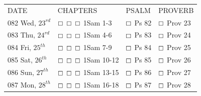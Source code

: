 \documentclass[11pt,landscape,twocolumn,letterpaper]{article}
\begin{document}
\begin{tabular}{p{0.8in}p{1.3in}p{1.2in}p{1.2in}}
DATE & CHAPTERS & PSALM & PROVERB \\
\tiny 082 \normalsize Wed, $23^{rd}$ & $\boxempty$ $\boxempty$ $\boxempty$ \hspace{.05in} \textcolor[rgb]{1.00,0.00,0.00}{1Sam 1-3} & $\boxempty$ \hspace{.05in} \textcolor[rgb]{0.00,1.00,0.00}{Ps 82} & $\boxempty$ \hspace{.05in} \textcolor[rgb]{0.00,0.00,1.00}{Prov 23}  \\

\tiny 083 \normalsize Thu, $24^{rd}$ & $\boxempty$ $\boxempty$ $\boxempty$ \hspace{.05in} \textcolor[rgb]{1.00,0.00,0.00}{1Sam 4-6} & $\boxempty$ \hspace{.05in} \textcolor[rgb]{0.00,1.00,0.00}{Ps 83} & $\boxempty$ \hspace{.05in} \textcolor[rgb]{0.00,0.00,1.00}{Prov 24}  \\

\tiny 084 \normalsize Fri, $25^{th}$ & $\boxempty$ $\boxempty$ $\boxempty$ \hspace{.05in} \textcolor[rgb]{1.00,0.00,0.00}{1Sam 7-9} & $\boxempty$ \hspace{.05in} \textcolor[rgb]{0.00,1.00,0.00}{Ps 84} & $\boxempty$ \hspace{.05in} \textcolor[rgb]{0.00,0.00,1.00}{Prov 25}  \\

\tiny 085 \normalsize Sat, $26^{th}$ &  $\boxempty$ $\boxempty$ $\boxempty$ \hspace{.05in} \textcolor[rgb]{1.00,0.00,0.00}{1Sam 10-12} &  $\boxempty$ \hspace{.05in} \textcolor[rgb]{0.00,1.00,0.00}{Ps 85} &  $\boxempty$ \hspace{.05in} \textcolor[rgb]{0.00,0.00,1.00}{Prov 26}  \\

\tiny 086 \normalsize Sun, $27^{th}$ &  $\boxempty$ $\boxempty$ $\boxempty$ \hspace{.05in} \textcolor[rgb]{1.00,0.00,0.00}{1Sam 13-15} &  $\boxempty$ \hspace{.05in} \textcolor[rgb]{0.00,1.00,0.00}{Ps 86} &  $\boxempty$ \hspace{.05in} \textcolor[rgb]{0.00,0.00,1.00}{Prov 27}  \\

\tiny 087 \normalsize Mon, $28^{th}$ &  $\boxempty$ $\boxempty$ $\boxempty$ \hspace{.05in} \textcolor[rgb]{1.00,0.00,0.00}{1Sam 16-18} &  $\boxempty$ \hspace{.05in} \textcolor[rgb]{0.00,1.00,0.00}{Ps 87} &  $\boxempty$ \hspace{.05in} \textcolor[rgb]{0.00,0.00,1.00}{Prov 28}  \\


\end{tabular}
\end{document}
